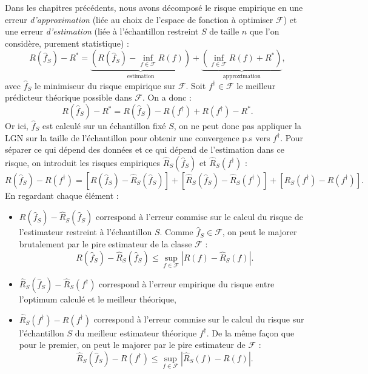 Dans les chapitres précédents, nous avons décomposé le risque empirique en une erreur \emph{d'approximation} (liée au choix de l'espace de fonction à optimiser $ \mathcal{F}$) et une erreur \emph{d'estimation} (liée à l'échantillon restreint $S$ de taille $n$ que l'on considère, purement statistique) : 
\begin{equation}
    R( \hat{f}_S) - R^* = \underbrace{\left(  R( \hat{f}_S) - \underset{f \in \mathcal{F}}{\inf } R(f) \right)}_{\text{estimation}} + \underbrace{\left( \underset{f \in \mathcal{F}}{\inf} R(f) + R^* \right)}_{\text{approximation}}, 
\end{equation}
avec $ \hat{f}_S$ le minimiseur du risque empirique sur $ \mathcal{F}$. Soit $f^\dagger \in \mathcal{F}$ le meilleur prédicteur théorique possible dans $ \mathcal{F}$. On a donc : 
\begin{equation}
    R( \hat{f}_S) - R^* = R( \hat{f}_S) - R(f^\dagger) + R(f^\dagger) - R^*. 
\end{equation}
Or ici, $ \hat{f}_S$ est calculé sur un échantillon fixé $S$, on ne peut donc pas appliquer la LGN sur la taille de l'échantillon pour obtenir une convergence p.s vers $f^\dagger$. Pour séparer ce qui dépend des données et ce qui dépend de l'estimation dans ce risque, on introduit les risques empiriques $ \hat{R}_S( \hat{f}_S)$ et $ \hat{R}_S(f^\dagger)$ : 
\begin{equation}
    R( \hat{f}_S) - R(f^\dagger) = \left[R( \hat{f}_S) - \hat{R}_S( \hat{f}_S)\right] + \left[ \hat{R}_S( \hat{f}_S) - \hat{R}_S(f^\dagger)\right] + \left[ \hat{R}_S(f^\dagger) - R(f^\dagger)\right]. 
\end{equation}
En regardant chaque élément : 
\begin{itemize}
    \item $ R( \hat{f}_S) - \hat{R}_S( \hat{f}_S)$ correspond à l'erreur commise sur le calcul du risque de l'estimateur restreint à l'échantillon $S$. Comme $ \hat{f}_S \in \mathcal{F}$, on peut le majorer brutalement par le pire estimateur de la classe $ \mathcal{F}$ : 
    \begin{equation}
        R( \hat{f}_S) - \hat{R}_S( \hat{f}_S) \leqslant \underset{f \in \mathcal{F}}{\sup} \left| R(f) - \hat{R}_S(f) \right|.
    \end{equation}
    \item $ \hat{R}_S( \hat{f}_S) - \hat{R}_S(f^\dagger)$ correspond à l'erreur empirique du risque entre l'optimum calculé et le meilleur théorique,
    \item $\hat{R}_S(f^\dagger) - R(f^\dagger)$ correspond à l'erreur commise sur le calcul du risque sur l'échantillon $S$ du meilleur estimateur théorique $f^\dagger$. De la même façon que pour le premier, on peut le majorer par le pire estimateur de $ \mathcal{F}$ : 
    \begin{equation}
        \hat{R}_S( \hat{f}_S) - R(f^\dagger) \leqslant \underset{f \in \mathcal{F}}{\sup} \left| \hat{R}_S(f) - R(f) \right|. 
    \end{equation}
\end{itemize}

